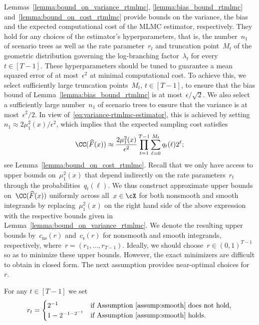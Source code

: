 \documentclass[11pt]{article}
\let\hat\widehat
\begin{document}
Lemmas~\ref{lemma:bound_on_variance_rtmlmc}, \ref{lemma:bias_bound_rtmlmc} and~\ref{lemma:bound_on_cost_rtmlmc} provide bounds on the variance, the bias and the expected computational cost of the MLMC estimator, respectively. They hold for any choices of the estimator's hyperparameters, that is, the number~$n_1$ of scenario trees as well as the rate parameter~$r_t$ and truncation point~$M_t$ of the geometric distribution governing the log-branching factor~$\lambda_t$ for every~$t\in[T-1]$. These hyperparameters should be tuned to guarantee a mean squared error of at most~$\epsilon^2$ at minimal computational cost. To achieve this, we select sufficiently large truncation points~$M_t$, $t\in[T-1]$, to ensure that the bias bound of Lemma~\ref{lemma:bias_bound_rtmlmc} is at most~$\epsilon/\sqrt{2}$. We also select a sufficiently large number~$n_1$ of scenario trees to ensure that the variance is at most~$\epsilon^2/2$. In view of~\eqref{eq:variance-rtmlmc-estimator}, this is achieved by setting~$n_1 \approx 2\mu_1^2(x)/\epsilon^2$, which implies that the expected sampling cost satisfies
\[
    \CC(\hat F(x)) \approx \frac{2 \mu_1^2(x)}{\epsilon^2} \prod_{t=1}^{T-1} \sum_{\ell=0}^{M_t} q_t(\ell)2^{\ell};
\]
see Lemma~\ref{lemma:bound_on_cost_rtmlmc}. Recall that we only have access to upper bounds on~$\mu_1^2(x)$ that depend indirectly on the rate parameters~$r_t$ through the probabilities~$q_t(\ell)$. We thus construct approximate upper bounds on~$\CC(\hat F(x))$ uniformly across all~$x\in\cX$ for both nonsmooth and smooth integrands by replacing~$\mu_1^2(x)$ on the right hand side of the above expression with the respective bounds given in Lemma~\ref{lemma:bound_on_variance_rtmlmc}. We denote the resulting upper bounds by~$c_{\mathrm{ns}}(r)$ and~$c_{\mathrm{s}}(r)$ for nonsmooth and smooth integrands, respectively, where~$r = (r_1, \ldots, r_{T-1})$. Ideally, we should choose~$r\in(0,1)^{T-1}$ so as to minimize these upper bounds. However, the exact minimizers are difficult to obtain in closed form. The next assumption provides near-optimal choices for~$r$.


\begin{assumption} 
\label{assump:rate-parameters-rtmlmc-funval}
For any $t\in[T-1]$ we set
\begin{align*}
    r_t=\begin{cases} 2^{-1}&\text{if Assumption~\ref{assump:smooth} does not hold,}\\
    1-2^{-1-2^{-t}} &\text{if Assumption~\ref{assump:smooth} holds.}
    \end{cases}
\end{align*}
\end{assumption}
\end{document}
